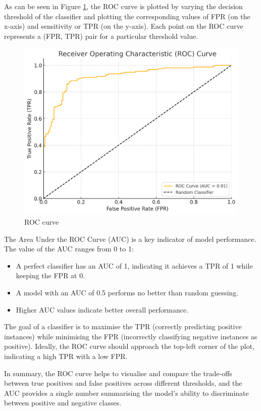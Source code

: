 		\bigskip
		
		As can be seen in Figure \ref{fig:img-receiver-operator-characteristic-curve}, the ROC curve is plotted by varying the decision threshold of the classifier and plotting the corresponding values of FPR (on the x-axis) and sensitivity or TPR (on the y-axis). Each point on the ROC curve represents a (FPR, TPR) pair for a particular threshold value.
		
		\begin{figure}[H]
			\centering
			\includegraphics[width=0.7\linewidth]{img/img-receiver-operator-characteristic-curve}
			\caption{ROC curve}
			\label{fig:img-receiver-operator-characteristic-curve}
		\end{figure}
	
		The Area Under the ROC Curve (AUC) is a key indicator of model performance. The value of the AUC ranges from 0 to 1:
		
		
		\begin{itemize}
			\item A perfect classifier has an AUC of 1, indicating it achieves a TPR of 1 while keeping the FPR at 0.
			\item A model with an AUC of 0.5 performs no better than random guessing.
			\item Higher AUC values indicate better overall performance.
		\end{itemize}
		\bigskip
		
		The goal of a classifier is to maximise the TPR (correctly predicting positive instances) while minimising the FPR (incorrectly classifying negative instances as positive). Ideally, the ROC curve should approach the top-left corner of the plot, indicating a high TPR with a low FPR.
		
		In summary, the ROC curve helps to visualise and compare the trade-offs between true positives and false positives across different thresholds, and the AUC provides a single number summarising the model's ability to discriminate between positive and negative classes.
	
	

